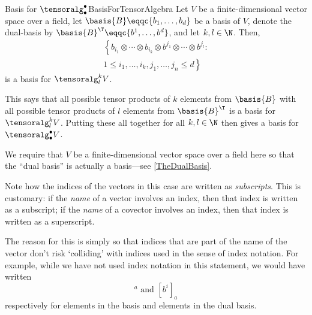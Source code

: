 \begin{prp}{Basis for $\tensoralg _{\bullet}^{\bullet}$}{BasisForTensorAlgebra}
	Let $V$ be a finite-dimensional vector space over a field, let $\basis{B}\eqqc \{ b_1,\ldots ,b_d\}$ be a basis of $V$, denote the dual-basis by $\basis{B}^{\T}\eqqc \{ b^1,\ldots ,b^d\}$, and let $k,l\in \N$.  Then,
	\begin{equation}
		\begin{multlined}
			\left\{ b_{i_1}\otimes \cdots \otimes b_{i_k}\otimes b^{j_1}\otimes \cdots \otimes b^{j_l}:\right. \\ \left. 1\leq i_1,\ldots ,i_k,j_1,\ldots ,j_n\leq d\right\}
		\end{multlined}
	\end{equation}
	is a basis for $\tensoralg _l^kV$.
	\begin{rmk}
		This says that all possible tensor products of $k$ elements from $\basis{B}$ with all possible tensor products of $l$ elements from $\basis{B}^{\T}$ is a basis for $\tensoralg _l^kV$.  Putting these all together for all $k,l\in \N$ then gives a basis for $\tensoralg _{\bullet}^{\bullet}V$.
	\end{rmk}
	\begin{rmk}
		We require that $V$ be a finite-dimensional vector space over a field here so that the ``dual basis'' is actually a basis---see \cref{TheDualBasis}.
	\end{rmk}
	\begin{rmk}
		Note how the indices of the vectors in this case are written as \emph{subscripts}.  This is customary:  if the \emph{name} of a vector involves an index, then that index is written as a subscript; if the \emph{name} of a covector involves an index, then that index is written as a superscript.
		
		The reason for this is simply so that indices that are part of the name of the vector don't risk `colliding' with indices used in the sense of index notation.  For example, while we have not used index notation in this statement, we would have written
		\begin{equation}
			[b_i]^a\text{ and }[b^i]_a
		\end{equation}
		respectively for elements in the basis and elements in the dual basis.
		

\end{rmk}
\end{prp}
